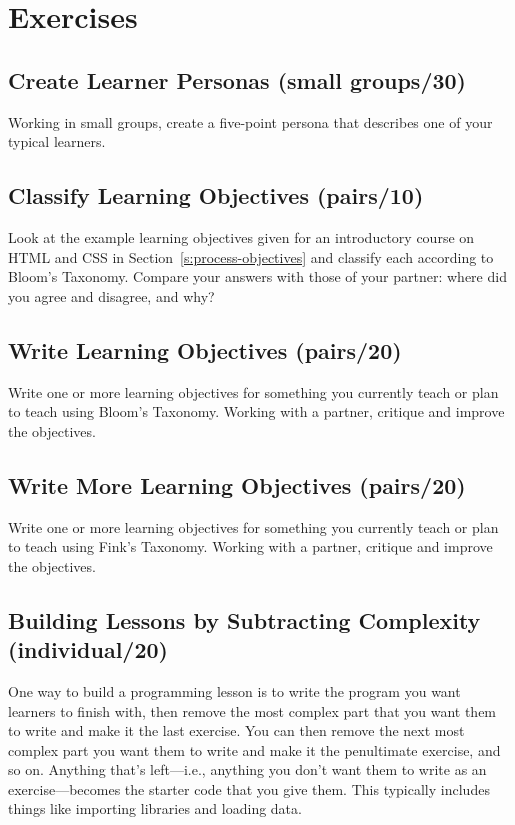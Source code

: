\section{Exercises}\label{s:process-exercises}

\subsection*{Create Learner Personas (small groups/30)}

Working in small groups, create a five-point persona that describes one
of your typical learners.

\subsection*{Classify Learning Objectives (pairs/10)}

Look at the example learning objectives given for an introductory course
on HTML and CSS in Section~\ref{s:process-objectives} and classify each
according to Bloom's Taxonomy. Compare your answers with those of your
partner: where did you agree and disagree, and why?

\subsection*{Write Learning Objectives (pairs/20)}

Write one or more learning objectives for something you currently teach
or plan to teach using Bloom's Taxonomy. Working with a partner,
critique and improve the objectives.

\subsection*{Write More Learning Objectives (pairs/20)}

Write one or more learning objectives for something you currently teach
or plan to teach using Fink's Taxonomy. Working with a partner, critique
and improve the objectives.

\subsection*{Building Lessons by Subtracting Complexity (individual/20)}

One way to build a programming lesson is to write the program you want
learners to finish with, then remove the most complex part that you want
them to write and make it the last exercise. You can then remove the
next most complex part you want them to write and make it the
penultimate exercise, and so on. Anything that's left---i.e., anything you
don't want them to write as an exercise---becomes the starter code that
you give them. This typically includes things like importing libraries
and loading data.


